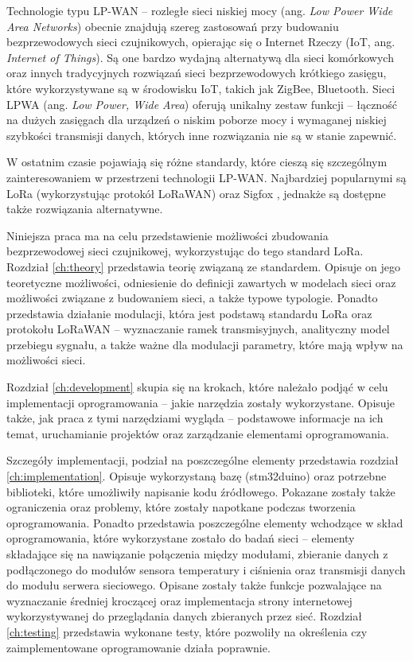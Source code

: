 Technologie typu LP-WAN -- rozległe sieci niskiej mocy (ang. \textsl{Low Power Wide Area Networks}) obecnie znajdują
szereg zastosowań przy budowaniu bezprzewodowych sieci czujnikowych, opierając się o Internet Rzeczy (IoT, ang.
\textsl{Internet of Things}). Są one bardzo wydajną alternatywą dla sieci komórkowych oraz innych tradycyjnych rozwiązań
sieci bezprzewodowych krótkiego zasięgu, które wykorzystywane są w środowisku IoT, takich jak ZigBee, Bluetooth. Sieci
LPWA (ang. \textsl{Low Power, Wide Area}) oferują unikalny zestaw funkcji -- łączność na dużych zasięgach dla urządzeń o
niskim poborze mocy i wymaganej niskiej szybkości transmisji danych, których inne rozwiązania nie są w stanie zapewnić.

W ostatnim czasie pojawiają się różne standardy, które cieszą się szczególnym zainteresowaniem w przestrzeni technologii
LP-WAN. Najbardziej popularnymi są LoRa (wykorzystując protokół LoRaWAN)\cite{lora-alliance} oraz Sigfox \cite{sigfox},
jednakże są dostępne także rozwiązania alternatywne.

Niniejsza praca ma na celu przedstawienie możliwości zbudowania bezprzewodowej sieci czujnikowej, wykorzystując do tego
standard LoRa. Rozdział \ref{ch:theory} przedstawia teorię związaną ze standardem. Opisuje on jego teoretyczne
możliwości, odniesienie do definicji zawartych w modelach sieci oraz możliwości związane z budowaniem sieci, a także
typowe typologie. Ponadto przedstawia działanie modulacji, która jest podstawą standardu LoRa oraz protokołu LoRaWAN --
wyznaczanie ramek transmisyjnych, analityczny model przebiegu sygnału, a także ważne dla modulacji parametry, które
mają wpływ na możliwości sieci.

Rozdział \ref{ch:development} skupia się na krokach, które należało podjąć w celu implementacji oprogramowania --
jakie narzędzia zostały wykorzystane. Opisuje także, jak praca z tymi narzędziami wygląda -- podstawowe informacje na
ich temat, uruchamianie projektów oraz zarządzanie elementami oprogramowania.

Szczegóły implementacji, podział na poszczególne elementy przedstawia rozdział \ref{ch:implementation}. Opisuje
wykorzystaną bazę (stm32duino) oraz potrzebne biblioteki, które umożliwiły napisanie kodu źródłowego. Pokazane zostały
także ograniczenia oraz problemy, które zostały napotkane podczas tworzenia oprogramowania. Ponadto przedstawia
poszczególne elementy wchodzące w skład oprogramowania, które wykorzystane zostało do badań sieci -- elementy składające
się na nawiązanie połączenia między modułami, zbieranie danych z podłączonego do modułów sensora temperatury i ciśnienia
oraz transmisji danych do modułu serwera sieciowego. Opisane zostały także funkcje pozwalające na wyznaczanie średniej
kroczącej oraz implementacja strony internetowej wykorzystywanej do przeglądania danych zbieranych przez sieć. Rozdział
\ref{ch:testing} przedstawia wykonane testy, które pozwoliły na określenia czy zaimplementowane oprogramowanie działa
poprawnie.

